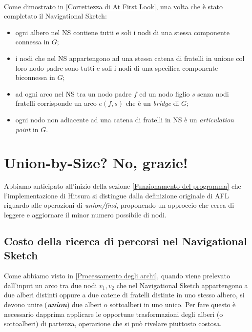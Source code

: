 \documentclass[a4paper,11pt]{report}
\begin{document}
\paragraph{}
Come dimostrato in \ref{Correttezza di At First Look}, una volta che è stato completato il Navigational Sketch:
\begin{itemize}
 \item ogni albero nel NS contiene tutti e soli i nodi di una stessa componente connessa in $G$;
 \item i nodi che nel NS appartengono ad una stessa catena di fratelli in unione col loro nodo padre sono tutti e soli i nodi di una
specifica componente biconnessa in $G$; 
 \item ad ogni arco nel NS tra un nodo padre $f$ ed un nodo figlio $s$ senza nodi fratelli corrisponde un arco $e\left(f,s\right)$ che è un
\emph{bridge} di $G$;
 \item ogni nodo non adiacente ad una catena di fratelli in NS è un \emph{articulation point} in $G$.
\end{itemize}



\section{Union-by-Size? No, grazie!}
Abbiamo anticipato all'inizio della sezione \ref{Funzionamento del programma} che l'implementazione di Hitsura si distingue dalla
definizione originale di AFL
riguardo alle operazioni di \emph{union/find}, proponendo un approccio che cerca di leggere e aggiornare il minor numero possibile di nodi.
\subsection{Costo della ricerca di percorsi nel Navigational Sketch}
Come abbiamo visto in \ref{Processamento degli archi}, quando viene prelevato dall'input un arco tra due nodi $v_1,v_2$ che nel Navigational
Sketch 
appartengono a due alberi distinti oppure a due catene di fratelli
distinte in uno stesso albero, si devono unire (\emph{\textbf{union}}) due alberi o sottoalberi in uno unico. Per fare questo è necessario
dapprima applicare le opportune 
trasformazioni degli alberi 
(o sottoalberi) di partenza, operazione che si può rivelare piuttosto costosa. 
\end{document}
